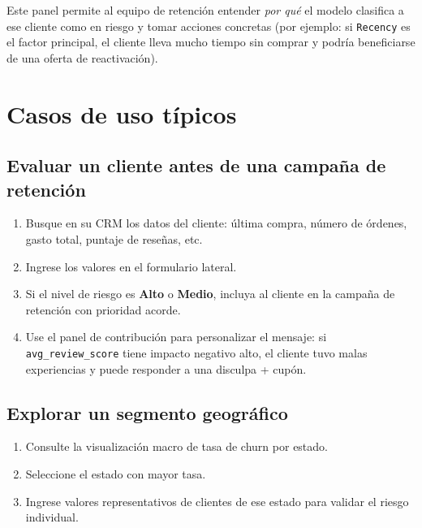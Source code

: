 \documentclass[11pt]{article}
\begin{document}
Este panel permite al equipo de retención entender \textit{por qué} el modelo
clasifica a ese cliente como en riesgo y tomar acciones concretas
(por ejemplo: si \texttt{Recency} es el factor principal, el cliente lleva
mucho tiempo sin comprar y podría beneficiarse de una oferta de reactivación).



\section{Casos de uso típicos}

\subsection{Evaluar un cliente antes de una campaña de retención}

\begin{enumerate}[itemsep=2pt]
  \item Busque en su CRM los datos del cliente: última compra, número de
        órdenes, gasto total, puntaje de reseñas, etc.
  \item Ingrese los valores en el formulario lateral.
  \item Si el nivel de riesgo es \textbf{Alto} o \textbf{Medio}, incluya
        al cliente en la campaña de retención con prioridad acorde.
  \item Use el panel de contribución para personalizar el mensaje: si
        \texttt{avg\_review\_score} tiene impacto negativo alto, el cliente
        tuvo malas experiencias y puede responder a una disculpa + cupón.
\end{enumerate}

\subsection{Explorar un segmento geográfico}

\begin{enumerate}[itemsep=2pt]
  \item Consulte la visualización macro de tasa de churn por estado.
  \item Seleccione el estado con mayor tasa.
  \item Ingrese valores representativos de clientes de ese estado para
        validar el riesgo individual.
\end{enumerate}
\end{document}
